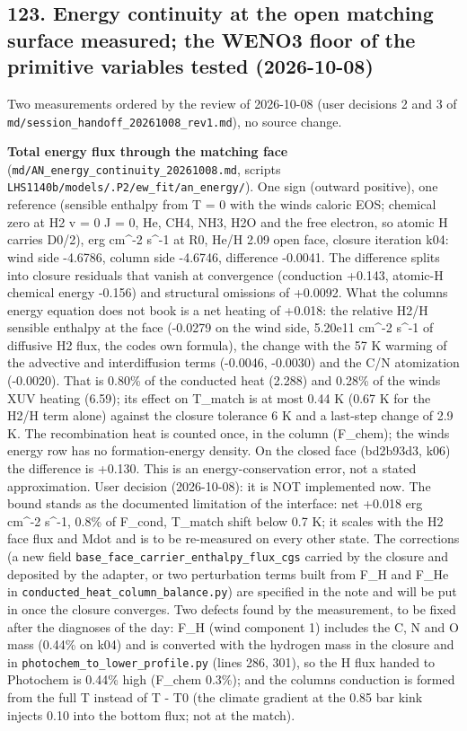 \documentclass[english,a4paper]{my_memo}
\begin{document}
\subsection{123. Energy continuity at the open matching surface measured; the WENO3 floor of the primitive variables tested (2026-10-08)}\label{123-energy-continuity-at-the-open-matching-surface-measured-the-weno3-floor-of-the-primitive-variables-tested-2026-10-08}

Two measurements ordered by the review of 2026-10-08 (user decisions 2 and 3 of
\texttt{md/session\_handoff\_20261008\_rev1.md}), no source change.

\textbf{Total energy flux through the matching face}
(\texttt{md/AN\_energy\_continuity\_20261008.md}, scripts \texttt{LHS1140b/models/.P2/ew\_fit/an\_energy/}).
One sign (outward positive), one reference (sensible enthalpy from T = 0 with the wind\textquotesingle s
caloric EOS; chemical zero at H2 v = 0 J = 0, He, CH4, NH3, H2O and the free electron,
so atomic H carries D0/2), erg cm\^{}-2 s\^{}-1 at R0, He/H 2.09 open face, closure
iteration k04: wind side -4.6786, column side -4.6746, difference -0.0041. The
difference splits into closure residuals that vanish at convergence (conduction
+0.143, atomic-H chemical energy -0.156) and structural omissions of +0.0092. What
the column\textquotesingle s energy equation does not book is a net heating of +0.018: the relative
H2/H sensible enthalpy at the face (-0.0279 on the wind side, 5.20e11 cm\^{}-2 s\^{}-1 of
diffusive H2 flux, the code\textquotesingle s own formula), the change with the 57 K warming of
the advective and interdiffusion terms (-0.0046, -0.0030) and the C/N atomization
(-0.0020). That is 0.80\% of the conducted heat (2.288) and 0.28\% of the wind\textquotesingle s XUV
heating (6.59); its effect on T\_match is at most 0.44 K (0.67 K for the H2/H term
alone) against the closure tolerance 6 K and a last-step change of 2.9 K. The
recombination heat is counted once, in the column (F\_chem); the wind\textquotesingle s energy row
has no formation-energy density. On the closed face (bd2b93d3, k06) the difference is
+0.130. This is an energy-conservation error, not a stated approximation.
User decision (2026-10-08): it is NOT implemented now. The bound stands as the
documented limitation of the interface: net +0.018 erg cm\^{}-2 s\^{}-1, 0.8\% of F\_cond,
T\_match shift below 0.7 K; it scales with the H2 face flux and Mdot and is to be
re-measured on every other state. The corrections (a new field
\texttt{base\_face\_carrier\_enthalpy\_flux\_cgs} carried by the closure and deposited by the
adapter, or two perturbation terms built from F\_H and F\_He in
\texttt{conducted\_heat\_column\_balance.py}) are specified in the note and will be put in once
the closure converges. Two defects found by the measurement, to be fixed after the
diagnoses of the day: F\_H (wind component 1) includes the C, N and O mass (0.44\% on
k04) and is converted with the hydrogen mass in the closure and in
\texttt{photochem\_to\_lower\_profile.py} (lines 286, 301), so the H flux handed to Photochem
is 0.44\% high (F\_chem 0.3\%); and the column\textquotesingle s conduction is formed from the full T
instead of T - T0 (the climate gradient at the 0.85 bar kink injects 0.10 into the
bottom flux; not at the match).
\end{document}

